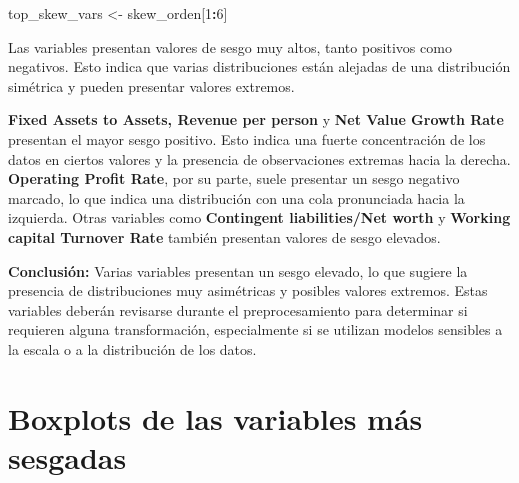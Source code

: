 \documentclass[
]{book}
\newenvironment{Shaded}{\begin{snugshade}}{\end{snugshade}}
\newcommand{\DecValTok}[1]{\textcolor[rgb]{0.00,0.00,0.81}{#1}}
\newcommand{\NormalTok}[1]{#1}
\newcommand{\OtherTok}[1]{\textcolor[rgb]{0.56,0.35,0.01}{#1}}
\newcommand{\SpecialCharTok}[1]{\textcolor[rgb]{0.81,0.36,0.00}{\textbf{#1}}}
\begin{document}
\begin{Shaded}
\begin{Highlighting}[]
\NormalTok{top\_skew\_vars }\OtherTok{\textless{}{-}}\NormalTok{ skew\_orden[}\DecValTok{1}\SpecialCharTok{:}\DecValTok{6}\NormalTok{]}
\end{Highlighting}
\end{Shaded}

Las variables presentan valores de sesgo muy altos, tanto positivos como negativos.
Esto indica que varias distribuciones están alejadas de una distribución simétrica y
pueden presentar valores extremos.

\textbf{Fixed Assets to Assets, Revenue per person} y \textbf{Net Value Growth Rate} presentan el
mayor sesgo positivo. Esto indica una fuerte concentración de los datos en ciertos
valores y la presencia de observaciones extremas hacia la derecha. \textbf{Operating Profit
Rate}, por su parte, suele presentar un sesgo negativo marcado, lo que indica una
distribución con una cola pronunciada hacia la izquierda. Otras variables como
\textbf{Contingent liabilities/Net worth} y \textbf{Working capital Turnover Rate} también
presentan valores de sesgo elevados.

\textbf{Conclusión:} Varias variables presentan un sesgo elevado, lo que sugiere la
presencia de distribuciones muy asimétricas y posibles valores extremos. Estas
variables deberán revisarse durante el preprocesamiento para determinar si requieren
alguna transformación, especialmente si se utilizan modelos sensibles a la escala o a
la distribución de los datos.

\section{Boxplots de las variables más sesgadas}\label{boxplots-de-las-variables-muxe1s-sesgadas}
\end{document}
